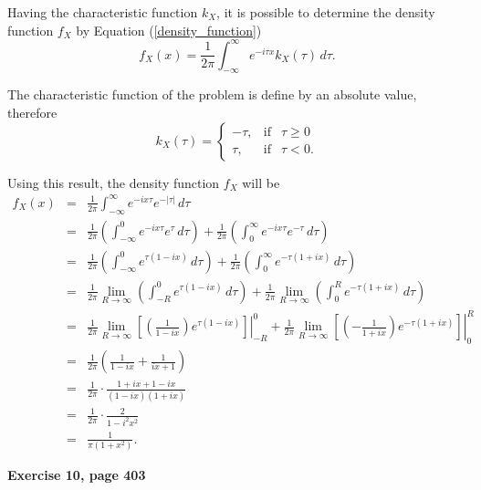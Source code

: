 \documentclass[12pt]{article}
\begin{document}
	Having the characteristic function $k_X$, it is possible to determine the density function $f_X$ by Equation (\ref{density_function})
	\begin{equation}
	f_X(x) = \frac{1}{2\pi} \int_{-\infty}^{\infty} e^{-i \tau x} k_X(\tau) \, d\tau.
	\label{density_function}
	\end{equation}
	
	The characteristic function of the problem is define by an absolute value, therefore
	\begin{equation}
	k_X(\tau)= \left\{ \begin{array}{lcc}
	-\tau, &   \text{if}  & \tau \geq 0 \\
	\tau, &  \text{if}  & \tau < 0.
	\end{array}
	\right.
	\label{char_func}
	\end{equation}
	
	Using this result, the density function $f_X$ will be
	\begin{eqnarray*}
	f_{X}{(x)} &=& \frac{1}{2\pi} \int_{-\infty}^{\infty} e^{-ix\tau} e^{-|\tau|}  \, d\tau \\
	&=& \frac{1}{2\pi} \left( \int_{-\infty}^{0}e^{-ix\tau} e^{\tau}\, d\tau \right) + \frac{1}{2\pi} \left( \int_{0}^{\infty}e^{-ix\tau} e^{-\tau}\, d\tau \right) \\ 
	&=& \frac{1}{2\pi} \left( \int_{-\infty}^{0}e^{\tau(1-ix)} \, d\tau \right) + \frac{1}{2\pi} \left( \int_{0}^{\infty}e^{-\tau(1+ix)} \, d\tau \right) \\ 
	&=& \frac{1}{2\pi} \lim_{R \rightarrow \infty} \left( \int_{-R}^{0} e^{\tau(1-ix)} \, d\tau \right) +  \frac{1}{2\pi} \lim_{R \rightarrow \infty} \left( \int_{0}^{R}   e^{-\tau(1+ix)} \, d\tau \right) \\ 
	&=& \frac{1}{2\pi} \lim_{R \rightarrow \infty} \left.\left[ \left( \frac{1}{1-ix}\right) e^{\tau(1-ix)} \right] \right|_{-R}^0 +  \frac{1}{2\pi} \lim_{R \rightarrow \infty} \left.\left[ \left( -\frac{1}{1+ix}\right) e^{-\tau(1+ix)} \right] \right|_{0}^R \\ 
	&=& \frac{1}{2\pi} \left( \frac{1}{1-ix} + \frac{1}{ix+1} \right) \\ 
	&=& \frac{1}{2\pi} \cdot \frac{1+ix+1-ix}{(1-ix)(1+ix)} \\ 
	&=& \frac{1}{2\pi} \cdot \frac{2}{1-i^2x^2}  \\ 
	&=& \frac{1}{\pi(1+x^2)}.
	\end{eqnarray*}
	
	
	{\bf Exercise 10, page 403}
	
\end{document}
